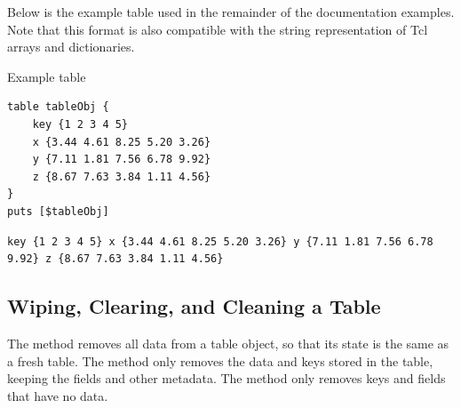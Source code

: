 Below is the example table used in the remainder of the documentation examples.
Note that this format is also compatible with the string representation of Tcl arrays and dictionaries.
\begin{example}{Example table}
\begin{lstlisting}
table tableObj {
    key {1 2 3 4 5} 
    x {3.44 4.61 8.25 5.20 3.26}
    y {7.11 1.81 7.56 6.78 9.92}
    z {8.67 7.63 3.84 1.11 4.56}
}
puts [$tableObj]
\end{lstlisting}
\tcblower
\begin{lstlisting}
key {1 2 3 4 5} x {3.44 4.61 8.25 5.20 3.26} y {7.11 1.81 7.56 6.78 9.92} z {8.67 7.63 3.84 1.11 4.56}
\end{lstlisting}
\end{example}

\subsection{Wiping, Clearing, and Cleaning a Table}
The method  removes all data from a table object, so that its state is the same as a fresh table.
The method  only removes the data and keys stored in the table, keeping the fields and other metadata.
The method  only removes keys and fields that have no data.
\begin{syntax}
\end{syntax}
\begin{syntax}
\end{syntax}
\begin{syntax}
\end{syntax}


\clearpage
